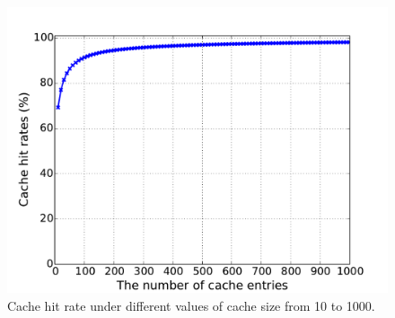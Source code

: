 \begin{figure}[!htb]
  \includegraphics[width=\linewidth]{figure/LRU}
{Cache hit rate under different values of cache size from 10 to 1000.}
\endminipage\hfill

\vspace{-0.1in}
\end{figure}

